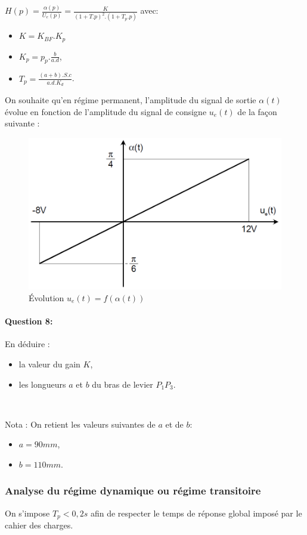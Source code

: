 $H(p)=\frac{\alpha(p)}{U_e(p)}=\frac{K}{(1+T.p)^2.(1+T_p.p)}$ avec:

\begin{itemize}
 \item $K=K_{BF}.K_p$
 \item $K_p=p_p.\frac{b}{a.d}$,
 \item $T_p=\frac{(a+b).S.c}{a.d.K_d}$.
\end{itemize}

On souhaite qu'en régime permanent, l'amplitude du signal de sortie $\alpha(t)$ évolue en fonction de l'amplitude du signal de consigne $u_e(t)$ de la façon suivante :

\begin{figure}[!h]
\centering\includegraphics[width=0.5\linewidth]{img/Tracteur26.png}
\caption{Évolution $u_e(t)=f(\alpha(t))$}
\label{fig26}
\end{figure}

\paragraph{Question 8:} En déduire :

\begin{itemize}
 \item la valeur du gain $K$,
 \item les longueurs $a$ et $b$ du bras de levier $P_{1}P_{3}$.
\end{itemize}

~\

Nota : On retient les valeurs suivantes de $a$ et de $b$:
\begin{itemize}
 \item $a=90mm$,
 \item $b=110mm$.
\end{itemize} 

\subsubsection{Analyse du régime dynamique ou régime transitoire}

On s'impose $T_p<0,2s$ afin de respecter le temps de réponse global imposé par le cahier des charges.

